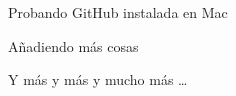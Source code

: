 \documentclass[12pt,a4paper]{article}
\author{JL Gutierrez Villanueva}
\begin{document}
Probando GitHub instalada en Mac

A\~nadiendo m\'as cosas

Y m\'as y m\'as y mucho m\'as \ldots
\end{document}
